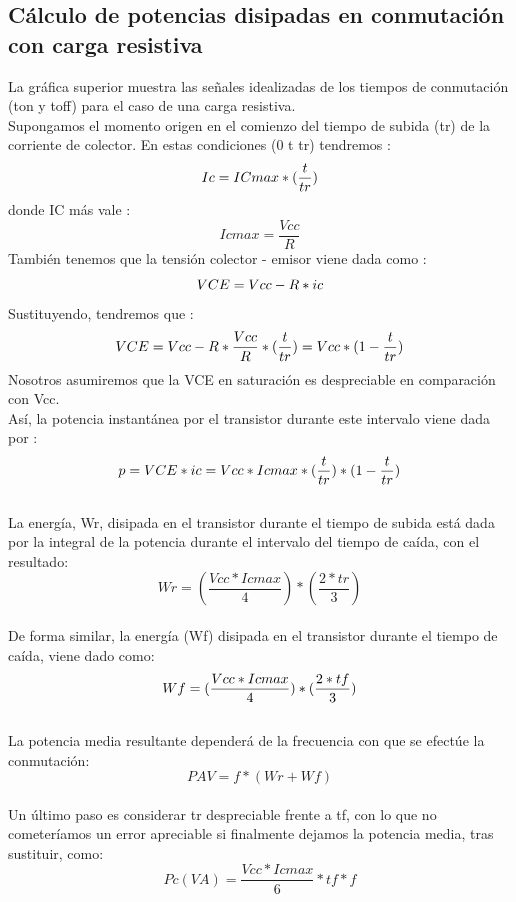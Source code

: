 \documentclass[12pt,a4paper]{article}
\begin{document}
\subsection{Cálculo de potencias disipadas en conmutación con carga resistiva}
La gráfica superior muestra las señales idealizadas de los tiempos de conmutación (ton y toff) para el caso de una carga resistiva.\\
Supongamos el momento origen en el comienzo del tiempo de subida (tr) de la corriente de colector. En estas condiciones (0 t tr) tendremos :\\
$$Ic = I{\tiny Cmax}  *  (\dfrac{t}{t{\tiny r}})$$
donde I{\tiny C} más vale :
$$Icmax = \dfrac{Vcc}{R}$$
También tenemos que la tensión colector - emisor viene dada como :
$$V{\tiny CE} = V{\tiny cc} - R * i{\tiny c}$$
Sustituyendo, tendremos que :
$$ V{\tiny CE} = V{\tiny cc} - R * \dfrac{V{\tiny cc}}{R} * (\dfrac{t}{tr}) = V{\tiny cc} * (1-\dfrac{t}{tr})$$
Nosotros asumiremos que la VCE en saturación es despreciable en comparación con Vcc.\\
Así, la potencia instantánea por el transistor durante este intervalo viene dada por :\\
$$p = V{\tiny CE} * i{\tiny c} = V{\tiny cc} * I{\tiny cmax} *(\dfrac{t}{tr}) * (1-\dfrac{t}{tr})$$\\
La energía, Wr, disipada en el transistor durante el tiempo de subida está dada por la integral de la potencia durante el intervalo del tiempo de caída, con el resultado:\\
$$Wr= (\dfrac{Vcc * Icmax}{4})*(\dfrac{2*tr}{3})$$\\
De forma similar, la energía (Wf) disipada en el transistor durante el tiempo de caída, viene dado como:\\
$$Wf=(\dfrac{V{\tiny cc}*Icmax}{4})*(\dfrac{2*tf}{3}) $$\\
La potencia media resultante dependerá de la frecuencia con que se efectúe la conmutación:\\
$$PAV = f * (Wr+Wf)$$\\
Un último paso es considerar tr despreciable frente a tf, con lo que no cometeríamos un error apreciable si finalmente dejamos la potencia media, tras sustituir, como:\\
$$Pc(VA) = \dfrac{Vcc * Icmax}{6}*tf*f$$\\
\end{document}
